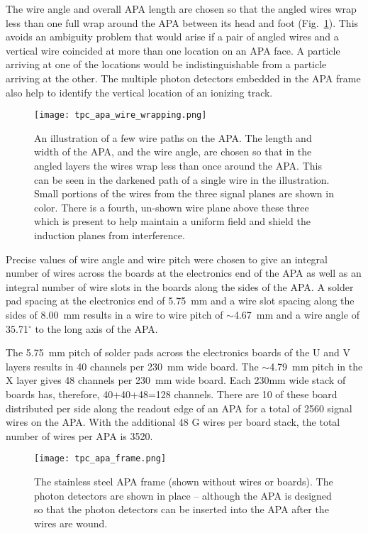 The wire angle and overall APA length are chosen so that the angled wires wrap less than one full wrap around the APA between its head and foot (Fig.~\ref{fig:tpc-wire-angle}).  This avoids an ambiguity problem that would arise if a pair of angled wires and a vertical wire coincided at more than one location on an APA face.  A particle arriving at one of the locations would be indistinguishable from a particle arriving at the other.  The multiple photon detectors embedded in the APA frame also help to identify the vertical location of an ionizing track.

\begin{figure}[htbp]
\centering
\texttt{[image: tpc\_apa\_wire\_wrapping.png]}
\caption[TPC APA wire wrapping illustration]{An illustration of a few wire paths on the APA.  The length and width of the APA, and the wire angle, are chosen so that in the angled layers the wires wrap less than once around the APA.  This can be seen in the darkened path of a single wire in the illustration.  Small portions of the wires from the three signal planes are shown in color.  There is a fourth, un-shown wire plane above these three which is present to help maintain a uniform field and shield the induction planes from interference. }
\label{fig:tpc-wire-angle}
\end{figure}


Precise values of wire angle and wire pitch were chosen to give an integral number of wires across the boards at the electronics end of the APA as well as an integral number of wire slots in the boards along the sides of the APA.  A solder pad spacing at the electronics end of 5.75~mm and a wire slot spacing along the sides of 8.00~mm results in a wire to wire pitch of $\sim$4.67~mm and a wire angle of 35.71$^\circ$ to the long axis of the APA.


The 5.75~mm pitch of solder pads across the electronics boards of the U and V layers results in 40 channels per 230~mm wide board.  The $\sim$4.79~mm pitch in the X layer gives 48 channels per 230~mm wide board.  Each 230mm wide stack of boards has, therefore, 40+40+48=128 channels.  There are 10 of these board distributed per side along the readout edge of an APA for a total of 2560 signal wires on the APA.  With the additional 48 G wires per board stack, the total number of wires per APA is 3520.




\begin{figure}[htpb]
\centering
\texttt{[image: tpc\_apa\_frame.png]}
\caption[Conceptual design of a wire frame]{The stainless steel APA frame (shown without wires or boards). The photon detectors are shown in place – although the APA is designed so that the photon detectors can be inserted into the APA after the wires are wound. }
\label{fig:tpc-wire-frame}
\end{figure}

